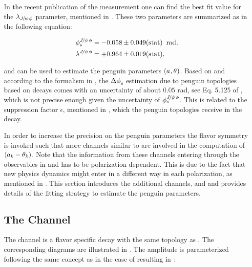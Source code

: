 In the recent \lhcb publication \cite{phis-3fb-paper} of the \phis measurement one can find the best fit value for the $\lambda_{{J\mskip -3mu/\mskip -2mu\psi\mskip 2mu}\phi}$
parameter, mentioned in . These two parameters are summarized as in the following equation:


\begin{subequations}
  \label{phis_lambda_result}
  \begin{align}
    \centering
    \phis^{\jpsi\Pphi}     &=  -0.058 \pm 0.049(\text{stat})  \;\; \text{rad},\\
    \lambda^{\jpsi\Pphi}   &=  +0.964 \pm 0.019(\text{stat}),
  \end{align}
\end{subequations}

\noindent and can be used to estimate the penguin parameters $(a_{},\theta_{})$.
Based on  and according to the formalism in , the $\Delta\phi_{s}^{}$ estimation
due to penguin topologies based on \BsJpsiPhi decays comes with an uncertainty of about $0.05$ rad, see Eq. 5.125 of \cite{DeBruyn-thesis},
which is not precise enough given the uncertainty of $\phi_{s}^{{J\mskip -3mu/\mskip -2mu\psi\mskip 2mu}\phi}$. This is related to the suppression factor $\epsilon$,
mentioned in , which the penguin topologies receive in the \BsJpsiPhi decay.

In order to increase the precision on the penguin parameters the \grpsuthree flavor symmetry is
invoked such that more channels similar to \BsJpsiPhi are involved in the computation of $(a_k-\theta_k)$.
Note that the information from these channels entering through the observables in  and 
has to be polarization dependent. This is due to the fact that new physics dynamics might enter in a different way in each polarization,
as mentioned in \cite{DeBruyn-thesis}.
This section introduces the additional channels, \BsJpsiKst and \BdJpsiRho and provides
details of the fitting strategy to estimate the penguin parameters.

\subsection{The \BsJpsiKst Channel}
\label{bsjpsikst_chanell}

The \BsJpsiKst channel is a flavor specific decay with the same topology as \BsJpsiPhi.
The corresponding diagrams are illustrated in .
The \BsJpsiKst amplitude is parameterized following the same concept as in the case of \BsJpsiPhi resulting in \cite{DeBruyn:2014oga}:

